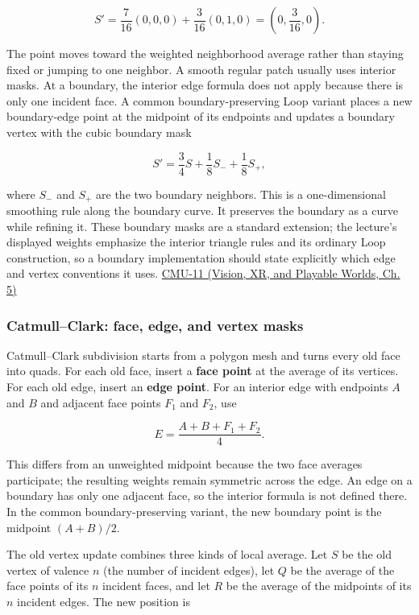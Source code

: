 \[
S'=\frac{7}{16}(0,0,0)+\frac{3}{16}(0,1,0)
=\left(0,\frac{3}{16},0\right).
\]

The point moves toward the weighted neighborhood average rather than staying fixed or jumping to one neighbor. A smooth regular patch usually uses interior masks. At a boundary, the interior edge formula does not apply because there is only one incident face. A common boundary-preserving Loop variant places a new boundary-edge point at the midpoint of its endpoints and updates a boundary vertex with the cubic boundary mask

\[
S'=\frac{3}{4}S+\frac{1}{8}S_{-}+\frac{1}{8}S_{+},
\]

where \(S_{-}\) and \(S_{+}\) are the two boundary neighbors. This is a one-dimensional smoothing rule along the boundary curve. It preserves the boundary as a curve while refining it. These boundary masks are a standard extension; the lecture's displayed weights emphasize the interior triangle rules and its ordinary Loop construction, so a boundary implementation should state explicitly which edge and vertex conventions it uses. \href{../07-Vision-XR-and-Playable-Worlds/main.pdf\#nameddest=04-visual-computing-ii-ch036-cmu-11---digital-geometry-processing}{CMU-11 (Vision, XR, and Playable Worlds, Ch. 5)}

\subsubsection{Catmull--Clark: face, edge, and vertex masks}\label{03-visual-computing-i-ch002-catmullclark-face-edge-and-vertex-masks}

Catmull--Clark subdivision starts from a polygon mesh and turns every old face into quads. For each old face, insert a \textbf{face point} at the average of its vertices. For each old edge, insert an \textbf{edge point}. For an interior edge with endpoints \(A\) and \(B\) and adjacent face points \(F_1\) and \(F_2\), use

\[
E=\frac{A+B+F_1+F_2}{4}.
\]

This differs from an unweighted midpoint because the two face averages participate; the resulting weights remain symmetric across the edge. An edge on a boundary has only one adjacent face, so the interior formula is not defined there. In the common boundary-preserving variant, the new boundary point is the midpoint \((A+B)/2\).

The old vertex update combines three kinds of local average. Let \(S\) be the old vertex of valence \(n\) (the number of incident edges), let \(Q\) be the average of the face points of its \(n\) incident faces, and let \(R\) be the average of the midpoints of its \(n\) incident edges. The new position is


